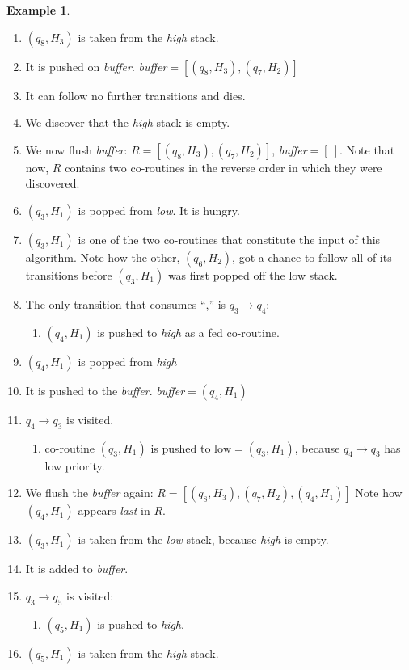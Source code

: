 \documentclass[english,twocolumn]{article}
\theoremstyle{definition}
\newtheorem{example}{Example}[section]
\begin{document}
\begin{example}
\begin{enumerate}
\item $(q_8, H_3)$ is taken from the \emph{high} stack.
\item It is pushed on \emph{buffer}. \emph{buffer}$=[(q_8, H_3), (q_7, H_2)]$
\item It can follow no further transitions and dies.
\item We discover that the \emph{high} stack is empty.
\item We now flush \emph{buffer}: $R=[(q_8, H_3), (q_7, H_2)]$, \emph{buffer}$=[\ ]$.
	Note that now, $R$ contains two co-routines in the reverse order in which they were discovered.
\item $(q_3, H_1)$ is popped from \emph{low}. It is hungry.
\item  $(q_3, H_1)$ is one of the two co-routines that constitute the
	input of this algorithm. Note how the other, $(q_6, H_2)$, got a
	chance to follow all of its transitions before $(q_3, H_1)$ was
	first popped off the low stack.
\item The only transition that consumes ``,'' is $q_3\rightarrow q_4$:\begin{enumerate}
	\item $(q_4, H_1)$ is pushed to \emph{high} as a fed co-routine.
\end{enumerate}
\item $(q_4, H_1)$ is popped from \emph{high}
\item It is pushed to the \emph{buffer}. \emph{buffer}$=(q_4, H_1)$
\item $q_4\rightarrow q_3$ is visited.
\begin{enumerate}
	\item co-routine $(q_3, H_1)$ is pushed to 
	$ \mbox{low} = (q_3, H_1)$, 
	because $q_4\rightarrow q_3$ has low priority.
\end{enumerate}
\item We flush the \emph{buffer} again: $R=[(q_8, H_3), (q_7, H_2), (q_4, H_1)]$
	Note how $(q_4, H_1)$ appears \emph{last} in $R$.
\item $(q_3, H_1)$ is taken from the \emph{low} stack, because \emph{high} is empty.
\item It is added to \emph{buffer}.
\item $q_3\rightarrow q_5$ is visited:\begin{enumerate}
	\item $(q_5, H_1)$ is pushed to \emph{high}.
\end{enumerate}
\item $(q_5, H_1)$ is taken from the \emph{high} stack.

\end{enumerate}
\end{example}
\end{document}
